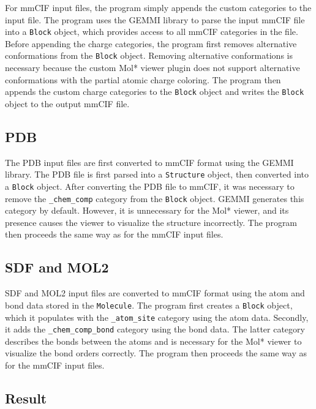 \documentclass[
  digital,     %
  oneside,     %
  nosansbold,  %
  nocolorbold, %
  lof,         %
  lot,         %
]{fithesis4}
\begin{document}
For mmCIF input files, the program simply appends the custom categories to the input file. The program uses the GEMMI library \cite{wojdyr2022gemmi} to parse the input mmCIF file into a \texttt{Block} object, which provides access to all mmCIF categories in the file. Before appending the charge categories, the program first removes alternative conformations from the \texttt{Block} object. Removing alternative conformations is necessary because the custom Mol* viewer plugin does not support alternative conformations with the partial atomic charge coloring. The program then appends the custom charge categories to the \texttt{Block} object and writes the \texttt{Block} object to the output mmCIF file.

\subsection{PDB}


The PDB input files are first converted to mmCIF format using the GEMMI library. The PDB file is first parsed into a \texttt{Structure} object, then converted into a \texttt{Block} object. After converting the PDB file to mmCIF, it was necessary to remove the \texttt{\_chem\_comp} category from the \texttt{Block} object. GEMMI generates this category by default. However, it is unnecessary for the Mol* viewer, and its presence causes the viewer to visualize the structure incorrectly. The program then proceeds the same way as for the mmCIF input files.

\subsection{SDF and MOL2}

SDF and MOL2 input files are converted to mmCIF format using the atom and bond data stored in the \texttt{Molecule}. The program first creates a \texttt{Block} object, which it populates with the \texttt{\_atom\_site} category using the atom data. Secondly, it adds the \texttt{\_chem\_comp\_bond} category using the bond data. The latter category describes the bonds between the atoms and is necessary for the Mol* viewer to visualize the bond orders correctly. The program then proceeds the same way as for the mmCIF input files.

\subsection*{Result}
\end{document}
